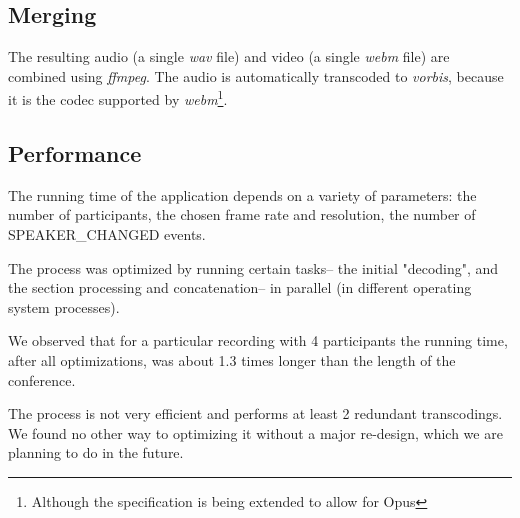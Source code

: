 \documentclass[twoside,openright,a4paper,12pt,english]{article}
\begin{document}
\subsection{Merging}
The resulting audio (a single \emph{wav} file) and video (a single \emph{webm} file)
are combined using \emph{ffmpeg}. The audio is automatically transcoded to \emph{vorbis}, because it is the codec supported by \emph{webm}\footnote{Although the specification is being extended to allow for Opus}.

\subsection{Performance}
The running time of the application depends on a variety of parameters: the
number of participants, the chosen frame rate and resolution, the number of
SPEAKER\_CHANGED events.

The process was optimized by running certain tasks-- the initial "decoding",
and the section processing and concatenation-- in parallel (in different
operating system processes). 

We observed that for a particular recording with 4
participants the running time, after all optimizations,
was about 1.3 times longer than the length of the conference. 

The process is not very efficient and performs at least 2 redundant
transcodings. We found no other way to optimizing it without a major re-design,
which we are planning to do in the future.
\end{document}
